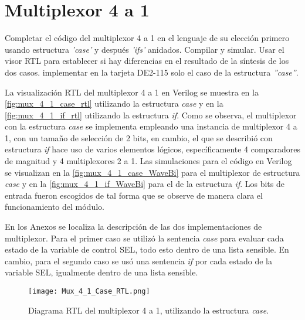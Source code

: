 \section{Multiplexor 4 a 1 \label{sec:s2}}

\begin{center}
	\begin{minipage}{12cm}
		\begin{tcolorbox}[title=Actividad 2]
			Completar el código del multiplexor 4 a 1 en el lenguaje de su elección primero usando estructura \textit{'case'} y después \textit{'ifs'} anidados. Compilar y simular. Usar el visor RTL para establecer si hay diferencias en el resultado de la síntesis de los dos casos. implementar en la tarjeta DE2-115 solo el caso de la estructura \textit{''case''}.
		\end{tcolorbox}	
	\end{minipage}
\end{center}

La visualización RTL del multiplexor 4 a 1 en Verilog se muestra en la \autoref{fig:mux_4_1_case_rtl} utilizando la estructura \textit{case} y en la \autoref{fig:mux_4_1_if_rtl} utilizando la estructura \textit{if}. Como se observa, el multiplexor con la estructura \textit{case} se implementa empleando una instancia de multiplexor 4 a 1, con un tamaño de selección de 2 bits, en cambio, el que se describió con estructura \textit{if} hace uso de varios elementos lógicos, específicamente 4 comparadores de magnitud y 4 multiplexores 2 a 1. Las simulaciones para el código en Verilog se visualizan en la \autoref{fig:mux_4_1_case_WaveBi} para el multiplexor de estructura \textit{case} y en la \autoref{fig:mux_4_1_if_WaveBi} para el de la estructura \textit{if}. Los bits de entrada fueron escogidos de tal forma que se observe de manera clara el funcionamiento del módulo.

En los Anexos se localiza la descripción de las dos implementaciones de multiplexor. Para el primer caso se utilizó la sentencia \textit{case} para evaluar cada estado de la variable de control SEL, todo esto dentro de una lista sensible. En cambio, para el segundo caso se usó una sentencia \textit{if} por cada estado de la variable SEL, igualmente dentro de una lista sensible.

\begin{figure}[ht]
	\centering
	\texttt{[image: Mux\_4\_1\_Case\_RTL.png]}
	\caption{Diagrama RTL del multiplexor 4 a 1, utilizando la estructura \textit{case}. \label{fig:mux_4_1_case_rtl}}
\end{figure}

